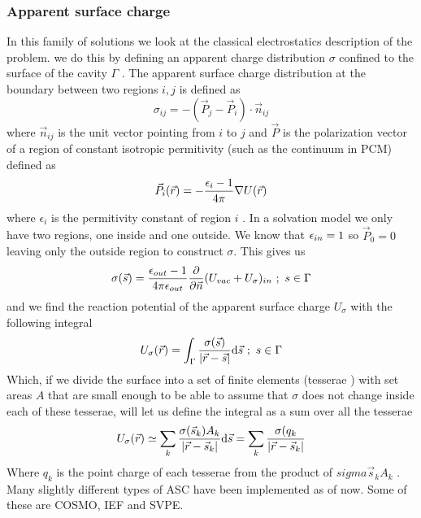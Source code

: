 \documentclass[../master_thesis.tex]{subfiles}
\begin{document}
\subsubsection{Apparent surface charge }
In this family of solutions we look at the classical electrostatics description
of the problem. we do this by defining an apparent charge distribution
$\sigma$ confined to the surface of the cavity $\Gamma$ \cite{Tomasi:1994wt, Tomasi:2005ipa}.
The apparent surface charge distribution at the boundary between two regions $i, j$
is defined as
\begin{equation}
  \sigma_{ij} = -(\vec{P}_j - \vec{P}_i)\cdot\vec{n}_{ij}
\end{equation}
where $\vec{n}_{ij}$ is the unit vector pointing from $i$ to $j$ and $\vec{P}$ is
the polarization vector of a region of constant isotropic permitivity (such as
the continuum in \ac{PCM}) defined as
\begin{equation}
  \vec{P}_i (\vec{r}) = - \frac{\epsilon_i - 1}{4\pi}\nabla U(\vec{r})
\end{equation}
where $\epsilon_i$ is the permitivity constant of region $i$ \cite{Tomasi:2005ipa}.
In a solvation model we only have two regions, one inside and one outside. We
know that $\epsilon_{in} = 1$ so $\vec{P}_0 = 0$ leaving only the outside region to
construct $\sigma$. This gives us \cite{Tomasi:2005ipa}
\begin{equation}
  \sigma(\vec{s}) =\frac{\epsilon_{out} - 1}{4\pi\epsilon_{out}} \frac{\partial}{\partial\vec{n}} (U_{vac} + U_{\sigma})_{in}\ ;\ s \in \Gamma
\end{equation}
and we find the reaction potential of the apparent surface charge $U_{\sigma}$
with the following integral
 \begin{equation}
   U_{\sigma}(\vec{r}) = \int_{\Gamma}\frac{\sigma(\vec{s})}{\abs{\vec{r} - \vec{s}}} \text{d}\vec{s}\ ;\ s \in \Gamma
 \end{equation}
Which, if we divide the surface into a set of finite elements (tesserae
\cite{Tomasi:2005ipa, Sorland}) with set areas $A$ that are small enough to be able
to assume that $\sigma$ does not change inside each of these tesserae, will let us define the integral
as a sum over all the tesserae
\begin{equation}
   U_{\sigma}(\vec{r}) \simeq \sum_k\frac{\sigma(\vec{s}_k) A_k}{\abs{\vec{r} - \vec{s}_k}} \text{d}\vec{s}
   = \sum_k\frac{\sigma(q_k}{\abs{\vec{r} - \vec{s}_k}}
\end{equation}
Where $q_k$ is the point charge of each tesserae from the product of $sigma{\vec{s}_k}A_k$
\cite{Tomasi:2005ipa}.
Many slightly different types of \ac{ASC} have been implemented as of now. Some of these
are \ac{COSMO}, \ac{IEF} and \ac{SVPE}.
\end{document}
